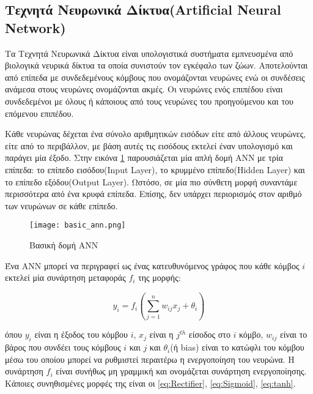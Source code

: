 \subsection{Τεχνητά Νευρωνικά Δίκτυα(Artificial Neural Network)}
\label{subsec:3.1.2}


Τα Τεχνητά Νευρωνικά Δίκτυα είναι υπολογιστικά συστήματα εμπνευσμένα  από βιολογικά νευρικά δίκτυα τα οποία συνιστούν τον εγκέφαλο των ζώων.  Αποτελούνται από επίπεδα
με συνδεδεμένους κόμβους που ονομάζονται νευρώνες ενώ οι συνδέσεις ανάμεσα στους νευρώνες ονομάζονται ακμές. Οι νευρώνες ενός επιπέδου είναι συνδεδεμένοι με όλους ή κάποιους από τους νευρώνες του προηγούμενου και του επόμενου επιπέδου.


Κάθε νευρώνας δέχεται ένα σύνολο αριθμητικών εισόδων είτε από άλλους νευρώνες, είτε από το περιβάλλον, με βάση αυτές τις εισόδους εκτελεί έναν υπολογισμό και παράγει μία έξοδο. Στην εικόνα \ref{figure:basicann} παρουσιάζεται μία απλή δομή ANN με τρία επίπεδα: το επίπεδο εισόδου(Input Layer), το κρυμμένο επίπεδο(Hidden Layer) και το επίπεδο εξόδου(Output Layer). Ωστόσο, σε μία πιο σύνθετη μορφή συναντάμε περισσότερα από ένα κρυφά επίπεδα. Επίσης, δεν υπάρχει περιορισμός στον αριθμό των νευρώνων σε κάθε επίπεδο.



\begin{figure}[!h]
    \centering
      \texttt{[image: basic\_ann.png]} \caption{Βασική δομή ANN}
          \label{figure:basicann}  

  \end{figure}



Ένα ANN μπορεί να περιγραφεί ως ένας κατευθυνόμενος γράφος που κάθε κόμβος $i$ εκτελεί μία συνάρτηση μεταφοράς $f_{i}$ της μορφής: \cite{Yao}




\begin{equation} \label{eq:1}
y_{i} = f_{i}(\sum_{j=1}^{n}w_{ij}x_{j}+\theta_{i})
\end{equation}


όπου $y_{i}$ είναι η έξοδος του κόμβου $i$, $x_{j}$ είναι η $j^{th}$ είσοδος στο $i$ κόμβο, $w_{ij}$ είναι το βάρος που συνδέει τους κόμβους $i$ και $j$ και $θ_{i}$(ή bias) είναι το κατώφλι του κόμβου μέσω του οποίου μπορεί να ρυθμιστεί περαιτέρω η ενεργοποίηση του νευρώνα. Η συνάρτηση $f_{i}$ είναι συνήθως μη γραμμική και ονομάζεται συνάρτηση ενεργοποίησης. Κάποιες συνηθισμένες μορφές της είναι οι \ref{eq:Rectifier}, \ref{eq:Sigmoid}, \ref{eq:tanh}.

